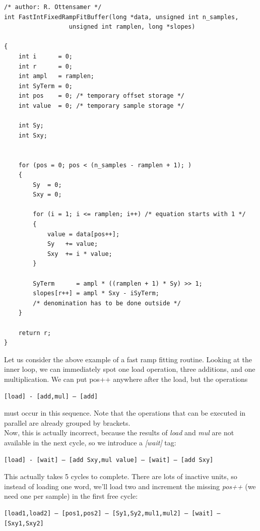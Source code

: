 \begin{minipage}{\linewidth}
\begin{lstlisting}
/* author: R. Ottensamer */
int FastIntFixedRampFitBuffer(long *data, unsigned int n_samples,
			      unsigned int ramplen, long *slopes)

{
	int i      = 0;
	int r      = 0;	
	int ampl   = ramplen;
	int SyTerm = 0;
	int pos    = 0; /* temporary offset storage */
	int value  = 0; /* temporary sample storage */

	int Sy;
	int Sxy;


	for (pos = 0; pos < (n_samples - ramplen + 1); )
	{
		Sy  = 0;
		Sxy = 0;

		for (i = 1; i <= ramplen; i++) /* equation starts with 1 */
		{
			value = data[pos++];
			Sy   += value;
			Sxy  += i * value;
		}

		SyTerm      = ampl * ((ramplen + 1) * Sy) >> 1;
		slopes[r++] = ampl * Sxy - iSyTerm;
		/* denomination has to be done outside */
	}

	return r;
}
\end{lstlisting}
\end{minipage}

\noindent
Let us consider the above example of a fast ramp fitting routine. Looking
at the inner loop, we can immediately spot one load operation, three additions,
and one multiplication.  We can put pos++ anywhere after the load, but the
operations

\begin{lstlisting}
[load] - [add,mul] – [add]
\end{lstlisting}

\noindent must occur in this sequence. Note that the operations that can be
executed in parallel are already grouped by brackets. \\

\noindent Now, this is actually incorrect, because the results of \emph{load}
and \emph{mul} are not available in the next cycle, so we introduce a
\emph{[wait]} tag:

\begin{lstlisting}
[load] - [wait] – [add Sxy,mul value] – [wait] – [add Sxy]
\end{lstlisting}

\noindent
This actually takes 5 cycles to complete. There are lots of inactive
units, so instead of loading one word, we'll load two and increment the missing
\emph{pos++} (we need one per sample) in the first free cycle:

\begin{lstlisting}
[load1,load2] – [pos1,pos2] – [Sy1,Sy2,mul1,mul2] – [wait] – [Sxy1,Sxy2]
\end{lstlisting}

